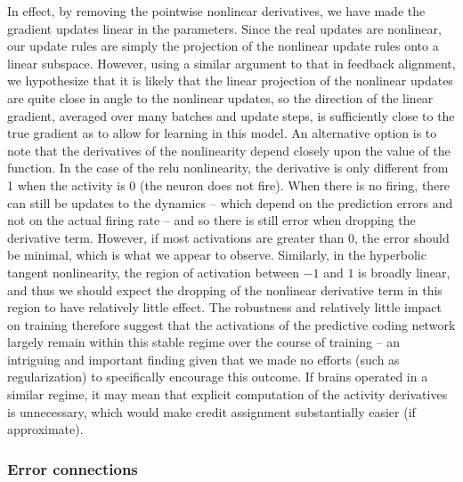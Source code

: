 In effect, by removing the pointwise nonlinear derivatives, we have made the gradient updates linear in the parameters. Since the real updates are nonlinear, our update rules are simply the projection of the nonlinear update rules onto a linear subspace. However, using a similar argument to that in feedback alignment, we hypothesize that it is likely that the linear projection of the nonlinear updates are quite close in angle to the nonlinear updates, so the direction of the linear gradient, averaged over many batches and update steps, is sufficiently close to the true gradient as to allow for learning in this model. An alternative option is to note that the derivatives of the nonlinearity depend closely upon the value of the function. In the case of the relu nonlinearity, the derivative is only different from 1 when the activity is 0 (the neuron does not fire). When there is no firing, there can still be updates to the dynamics -- which depend on the prediction errors and not on the actual firing rate -- and so there is still error when dropping the derivative term. However, if most activations are greater than 0, the error should be minimal, which is what we appear to observe. Similarly, in the hyperbolic tangent nonlinearity, the region of activation between $-1$ and $1$ is broadly linear, and thus we should expect the dropping of the nonlinear derivative term in this region to have relatively little effect. The robustness and relatively little impact on training therefore suggest that the activations of the predictive coding network largely remain within this stable regime over the course of training -- an intriguing and important finding given that we made no efforts (such as regularization) to specifically encourage this outcome. If brains operated in a similar regime, it may mean that explicit computation of the activity derivatives is unnecessary, which would make credit assignment substantially easier (if approximate).

\subsubsection{Error connections}
 
